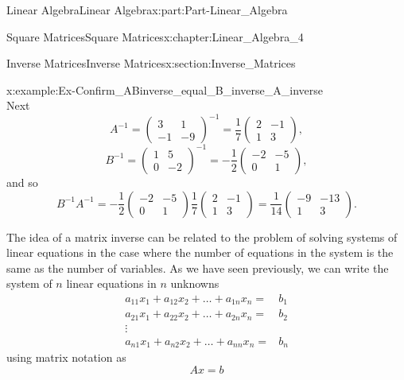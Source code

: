 \documentclass[oneside,10pt,]{book}
\numberwithin{equation}{section}
\newcommand{\amp}{&}
\begin{document}
\begin{partptx}{Linear Algebra}{}{Linear Algebra}{}{}{x:part:Part-Linear_Algebra}
\begin{chapterptx}{Square Matrices}{}{Square Matrices}{}{}{x:chapter:Linear_Algebra_4}
\begin{sectionptx}{Inverse Matrices}{}{Inverse Matrices}{}{}{x:section:Inverse_Matrices}
\begin{example}{}{x:example:Ex-Confirm_ABinverse_equal_B_inverse_A_inverse}
\begin{equation*}
\end{equation*}
Next%
\begin{equation*}
A^{-1}=\begin{pmatrix} 3 \amp 1 \\ -1 \amp -9 \end{pmatrix}^{-1} = \frac{1}{7}\begin{pmatrix} 2 \amp -1 \\ 1 \amp 3 \end{pmatrix}, 
\end{equation*}
%
\begin{equation*}
B^{-1}=\begin{pmatrix} 1 \amp 5 \\ 0 \amp -2 \end{pmatrix}^{-1} = -\frac{1}{2}\begin{pmatrix} -2 \amp -5 \\ 0 \amp 1 \end{pmatrix}, 
\end{equation*}
and so%
\begin{equation*}
B^{-1}A^{-1}= -\frac{1}{2}\begin{pmatrix} -2 \amp -5 \\ 0 \amp 1 \end{pmatrix} \frac{1}{7}\begin{pmatrix} 2 \amp -1 \\ 1 \amp 3 \end{pmatrix} = \frac{1}{14}\begin{pmatrix} -9 \amp -13 \\ 1 \amp 3 \end{pmatrix}. 
\end{equation*}
\end{example}
The idea of a matrix inverse can be related to the problem of solving systems of linear equations in the case where the number of equations in the system is the same as the number of variables.  As we have seen previously, we can write the system of \(n \) linear equations in \(n \) unknowns%
%
\begin{align*}
a_{11} x_{1}+a_{12}x_{2} + \dots +a_{1n} x_{n}= \amp b_{1}\\
a_{21} x_{1}+a_{22}x_{2} + \dots +a_{2n} x_{n}= \amp b_{2}\\
\vdots \amp \\
a_{n1} x_{1}+a_{n2}x_{2} + \dots +a_{nn} x_{n}= \amp b_{n}
\end{align*}
using matrix notation as%
\begin{equation}
Ax=b\label{x:men:Ax_equal_b}

\end{equation}
\end{sectionptx}
\end{chapterptx}
\end{partptx}
\end{document}
